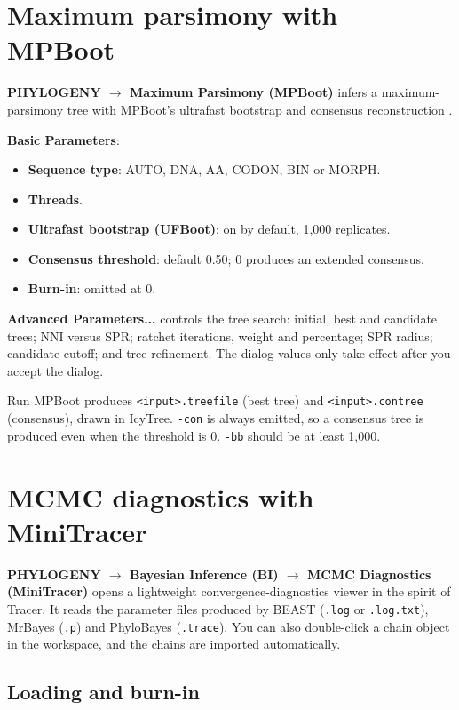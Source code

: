\documentclass[10pt]{report}
\begin{document}
\section{Maximum parsimony with MPBoot}

\textbf{PHYLOGENY $\rightarrow$ Maximum Parsimony (MPBoot)} infers a
maximum-parsimony tree with MPBoot's ultrafast bootstrap and consensus
reconstruction \cite{mpboot}.

\textbf{Basic Parameters}:

\begin{itemize}
  \item \textbf{Sequence type}: AUTO, DNA, AA, CODON, BIN or MORPH.
  \item \textbf{Threads}.
  \item \textbf{Ultrafast bootstrap (UFBoot)}: on by default, 1{,}000
        replicates.
  \item \textbf{Consensus threshold}: default 0.50; 0 produces an extended
        consensus.
  \item \textbf{Burn-in}: omitted at 0.
\end{itemize}

\textbf{Advanced Parameters...} controls the tree search: initial, best and
candidate trees; NNI versus SPR; ratchet iterations, weight and percentage;
SPR radius; candidate cutoff; and tree refinement. The dialog values only take
effect after you accept the dialog.

Run MPBoot produces \texttt{<input>.treefile} (best tree) and
\texttt{<input>.contree} (consensus), drawn in IcyTree. \texttt{-con} is always
emitted, so a consensus tree is produced even when the threshold is 0.
\texttt{-bb} should be at least 1{,}000.

\section{MCMC diagnostics with MiniTracer}

\textbf{PHYLOGENY $\rightarrow$ Bayesian Inference (BI) $\rightarrow$ MCMC
Diagnostics (MiniTracer)} opens a lightweight convergence-diagnostics viewer in
the spirit of Tracer. It reads the parameter files produced by BEAST
(\texttt{.log} or \texttt{.log.txt}), MrBayes (\texttt{.p}) and PhyloBayes
(\texttt{.trace}). You can also double-click a chain object in the workspace,
and the chains are imported automatically.

\subsection{Loading and burn-in}
\end{document}
